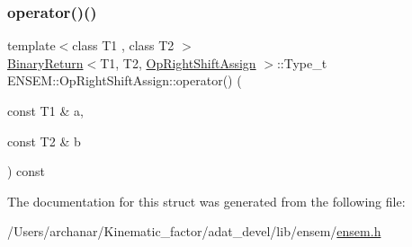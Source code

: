 \mbox{\label{structENSEM_1_1OpRightShiftAssign_a9ff0eba54a134afd57441ec8450a745e}} 
\subsubsection{\texorpdfstring{operator()()}{operator()()}\hspace{0.1cm}{\footnotesize\ttfamily [2/2]}}
{\footnotesize\ttfamily template$<$class T1 , class T2 $>$ \\
\mbox{\hyperlink{structENSEM_1_1BinaryReturn}{Binary\+Return}}$<$T1, T2, \mbox{\hyperlink{structENSEM_1_1OpRightShiftAssign}{Op\+Right\+Shift\+Assign}} $>$\+::Type\+\_\+t E\+N\+S\+E\+M\+::\+Op\+Right\+Shift\+Assign\+::operator() (\begin{DoxyParamCaption}\item[{const T1 \&}]{a,  }\item[{const T2 \&}]{b }\end{DoxyParamCaption}) const\hspace{0.3cm}{\ttfamily [inline]}}



The documentation for this struct was generated from the following file\+:\begin{DoxyCompactItemize}
\item 
/\+Users/archanar/\+Kinematic\+\_\+factor/adat\+\_\+devel/lib/ensem/\mbox{\hyperlink{lib_2ensem_2ensem_8h}{ensem.\+h}}\end{DoxyCompactItemize}
